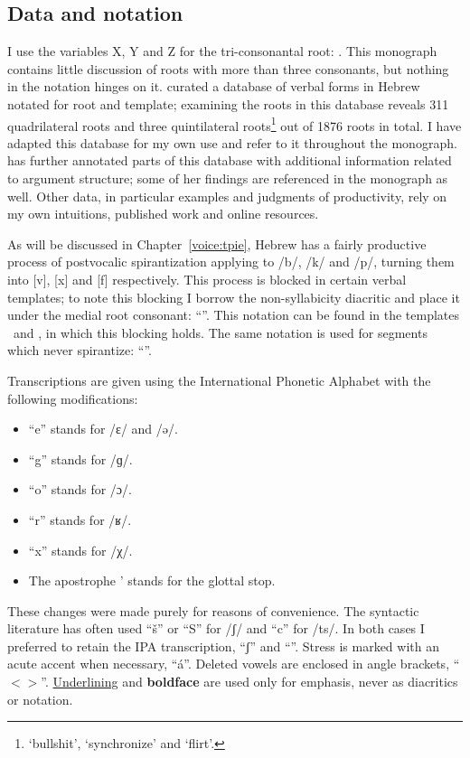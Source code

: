 	\subsection{Data and notation} \label{sec:data:notation}
I use the variables X, Y and Z for the tri-consonantal root: . This monograph contains little discussion of roots with more than three consonants, but nothing in the notation hinges on it. \cite{ehrenfeld12} curated a database of verbal forms in Hebrew notated for root and template; examining the roots in this database reveals 311 quadrilateral roots and three quintilateral roots\footnote{ `bullshit',  `synchronize' and  `flirt'.} out of 1876 roots in total. I have adapted this database for my own use and refer to it throughout the monograph. \cite{ahdout19phd} has further annotated parts of this database with additional information related to argument structure; some of her findings are referenced in the monograph as well. Other data, in particular examples and judgments of productivity, rely on my own intuitions, published work and online resources.

As will be discussed in Chapter~\ref{voice:tpie}, Hebrew has a fairly productive process of postvocalic spirantization applying to /b/, /k/ and /p/, turning them into [v], [x] and [f] respectively. This process is blocked in certain verbal templates; to note this blocking I borrow the non-syllabicity diacritic and place it under the medial root consonant: ``''. This notation can be found in the templates \tpie~and \thit, in which this blocking holds. The same notation is used for segments which never spirantize: ``''.

Transcriptions are given using the International Phonetic Alphabet with the following modifications:
\begin{itemize}
	\item ``e'' stands for /ɛ/ and /ə/.
	\item ``g'' stands for /ɡ/.
	\item ``o'' stands for /ɔ/.
	\item ``r'' stands for /ʁ/.
	\item ``x'' stands for /χ/.
	\item The apostrophe ' stands for the glottal stop. %
\end{itemize}
These changes were made purely for reasons of convenience. The syntactic literature has often used ``\v{s}'' or ``S'' for /ʃ/ and ``c'' for /ts/. In both cases I preferred to retain the IPA transcription, ``ʃ'' and ``{\ts}''. Stress is marked with an acute accent when necessary, ``\'a''. Deleted vowels are enclosed in angle brackets, ``$<>$''. \underline{Underlining} and \textbf{boldface} are used only for emphasis, never as diacritics or notation.

